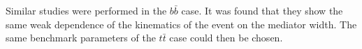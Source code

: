 Similar studies were performed in the $b \bar b$ case. It was found that they 
show the same weak dependence of the kinematics of the event on the mediator width.
The same benchmark parameters of the $t\bar t$ case could then be chosen.


%
%



% 
% 
